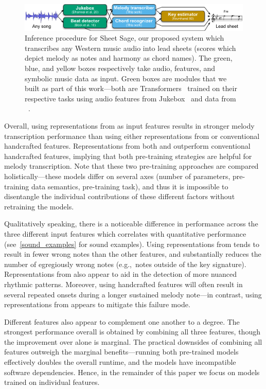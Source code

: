 \begin{figure}
    \centering
    \includegraphics[width=\linewidth]{figs/sheetsage.pdf}
    \caption{Inference procedure for Sheet Sage, our proposed system which transcribes any Western music audio into lead sheets (scores which depict melody as notes and harmony as chord names). The green, blue, and yellow boxes respectively take audio, features, and symbolic music data as input. Green boxes are modules that we built as part of this work---both are Transformers~\cite{vaswani2017attention} trained on their respective tasks using audio features from Jukebox~\cite{dhariwal2020jukebox} and data from \hooktheory~\cite{hooktheory}.}
    \label{fig:sheet_sage}
    \vspace{-3mm}
\end{figure}

Overall, using representations from \jukebox{} as input features results in stronger melody transcription performance than using either representations from \mtthree{} or conventional handcrafted features. 
Representations from both \mtthree{} and \jukebox{} outperform conventional handcrafted features, 
implying that both pre-training strategies are helpful for melody transcription. 
Note that these two pre-training approaches are compared holistically---these models differ on several axes 
(number of parameters, 
pre-training data semantics, 
pre-training task), 
and thus it is impossible to disentangle the individual contributions of these different factors without retraining the models. 

Qualitatively speaking, there is a noticeable difference in performance across the three different input features which correlates with quantitative performance (see~\cref{sound_examples} for sound examples). 
Using representations from \jukebox{} tends to result in fewer wrong notes than the other features, and substantially reduces the number of egregiously wrong notes (e.g.,~notes outside of the key signature). 
Representations from \jukebox{} also appear to aid in the detection of more nuanced rhythmic patterns. 
Moreover, using handcrafted features will often result in several repeated onsets during a longer sustained melody note---in contrast, using representations from \jukebox{} appears to mitigate this failure mode.

Different features also appear to complement one another to a degree. 
The strongest performance overall is obtained by combining all three features, though the improvement over \jukebox{} alone is marginal. 
The practical downsides of combining all features outweigh the marginal benefits---running both pre-trained models effectively doubles the overall runtime, and the models have incompatible software dependencies. 
Hence, in the remainder of this paper we focus on models trained on individual features.

